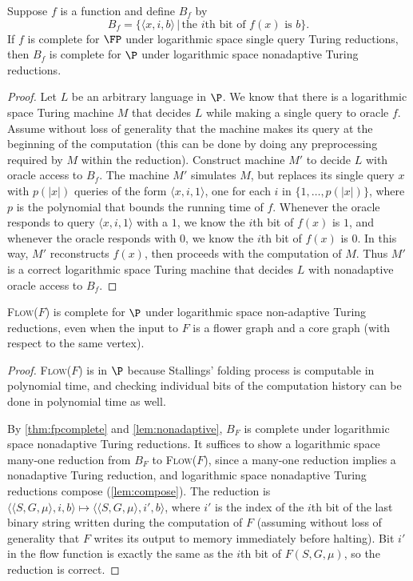 \documentclass{article}
\newcommand{\Flow}{\textsc{Flow($F$)}}
\begin{document}
\begin{lemma}\label{lem:nonadaptive}
  Suppose $f$ is a function and define $B_f$ by
  \begin{equation*}
    B_f = \{ \langle x, i, b \rangle \,|\, \text{the } i \text{th bit of } f(x) \text{ is } b \}.
  \end{equation*}
  If $f$ is complete for $\FP$ under logarithmic space single query Turing reductions, then $B_f$ is complete for $\P$ under logarithmic space nonadaptive Turing reductions.
\end{lemma}
\begin{proof}
  Let $L$ be an arbitrary language in $\P$.
  We know that there is a logarithmic space Turing machine $M$ that decides $L$ while making a single query to oracle $f$.
  Assume without loss of generality that the machine makes its query at the beginning of the computation (this can be done by doing any preprocessing required by $M$ within the reduction).
  Construct machine $M'$ to decide $L$ with oracle access to $B_f$.
  The machine $M'$ simulates $M$, but replaces its single query $x$ with $p(|x|)$ queries of the form $\langle x, i, 1 \rangle$, one for each $i$ in $\{1, \dotsc, p(|x|) \}$, where $p$ is the polynomial that bounds the running time of $f$.
  Whenever the oracle responds to query $\langle x, i, 1 \rangle$ with a $1$, we know the $i$th bit of $f(x)$ is $1$, and whenever the oracle responds with $0$, we know the $i$th bit of $f(x)$ is $0$.
  In this way, $M'$ reconstructs $f(x)$, then proceeds with the computation of $M$.
  Thus $M'$ is a correct logarithmic space Turing machine that decides $L$ with nonadaptive oracle access to $B_f$.
\end{proof}

\begin{theorem}
  \Flow{} is complete for $\P$ under logarithmic space non-adaptive Turing reductions, even when the input to $F$ is a flower graph and a core graph (with respect to the same vertex).
\end{theorem}
\begin{proof}
  \Flow{} is in $\P$ because Stallings' folding process is computable in polynomial time, and checking individual bits of the computation history can be done in polynomial time as well.

  By \autoref{thm:fpcomplete} and \autoref{lem:nonadaptive}, $B_F$ is complete under logarithmic space nonadaptive Turing reductions.
  It suffices to show a logarithmic space many-one reduction from $B_F$ to \Flow{}, since a many-one reduction implies a nonadaptive Turing reduction, and logarithmic space nonadaptive Turing reductions compose (\autoref{lem:compose}).
  The reduction is $\langle \langle S, G, \mu \rangle, i, b \rangle \mapsto \langle \langle S, G, \mu \rangle, i', b\rangle$, where $i'$ is the index of the $i$th bit of the last binary string written during the computation of $F$ (assuming without loss of generality that $F$ writes its output to memory immediately before halting).
  Bit $i'$ in the flow function is exactly the same as the $i$th bit of $F(S, G, \mu)$, so the reduction is correct.
\end{proof}
\end{document}
